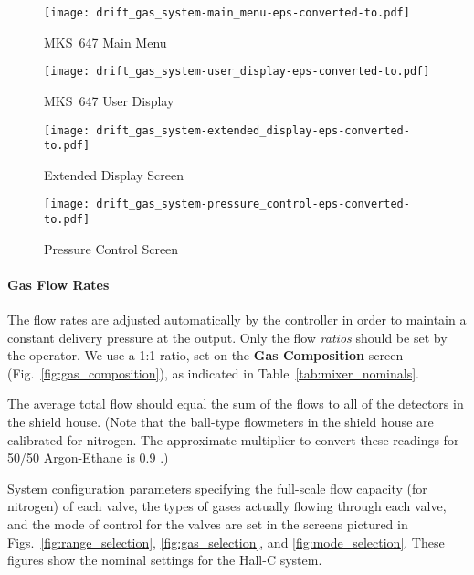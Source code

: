 {\begin{figure}[tb]
\end{figure}
%
\begin{center}
\begin{figure}[hbt]
\begin{minipage}{2.7in}
\texttt{[image: drift\_gas\_system-main\_menu-eps-converted-to.pdf]}
\caption{MKS~647 Main Menu\label{fig:main_menu}}
\end{minipage}
\begin{minipage}{2.7in}
\texttt{[image: drift\_gas\_system-user\_display-eps-converted-to.pdf]}
\caption{MKS~647 User Display\label{fig:user_display}}
\end{minipage}
\end{figure}
\end{center}
%
\begin{center}
\begin{figure}[hbt]
\begin{minipage}{2.7in}
\texttt{[image: drift\_gas\_system-extended\_display-eps-converted-to.pdf]}
\caption{Extended Display Screen\label{fig:extended_display}}
\end{minipage}
\begin{minipage}{2.7in}
\texttt{[image: drift\_gas\_system-pressure\_control-eps-converted-to.pdf]}
\caption{Pressure Control Screen\label{fig:pressure_control}}
\end{minipage}
\end{figure}
\end{center}
\paragraph{Gas Flow Rates}
\label{sec:gas_flow_rates}
The flow rates are adjusted automatically by the controller in order
to maintain a constant delivery pressure at the output. Only the flow
{\em ratios} should be set by the operator. We use a 1:1 ratio, set on
the {\bf Gas Composition} screen (Fig.~\ref{fig:gas_composition}), as
indicated in Table~\ref{tab:mixer_nominals}.

The average total flow should equal the sum of the flows to all of the
detectors in the shield house. (Note that the ball-type flowmeters in
the shield house are calibrated for nitrogen. The approximate
multiplier to convert these readings for 50/50 Argon-Ethane is 0.9 .)

System configuration parameters specifying the full-scale flow
capacity (for nitrogen) of each valve, the types of gases actually
flowing through each valve, and the mode of control for the valves are
set in the screens pictured in Figs.~\ref{fig:range_selection},
\ref{fig:gas_selection}, and \ref{fig:mode_selection}. These figures
show the nominal settings for the Hall-C system.

}
